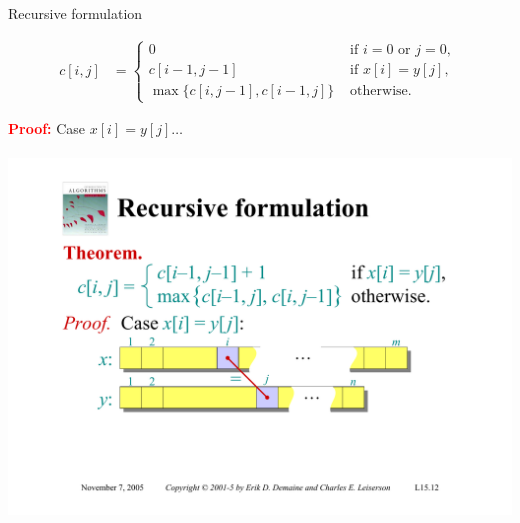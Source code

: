 \documentclass[aspectratio=169]{beamer}
\begin{document}
\begin{frame}{Recursive formulation}
    \begin{tcolorbox}[title=Theorem]
        \begin{equation*}
            \begin{align*}
                c[i, j] &=
                            \begin{cases}
                                0 & \text{ if } i = 0 \text{ or } j = 0 \text{, } \\
                                c[i - 1, j - 1] & \text{ if } x[i] = y[j] \text{, } \\
                                \max \{ c[i, j - 1], c[i - 1, j] \} & \text{ otherwise.}
                            \end{cases}
            \end{align*}
        \end{equation*}
    \end{tcolorbox}
    \textcolor{red}{\textbf{Proof:}} Case $x[i] = y[j] \ldots$ \\
    \\
    \includegraphics[width=\textwidth,trim=3cm 5cm 3cm 10.50cm, clip]{figures/proof01.pdf}
\end{frame}
\end{document}
